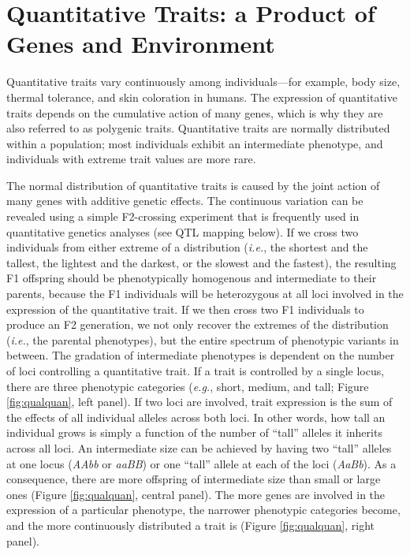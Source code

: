 \documentclass[
]{book}
\begin{document}
\hypertarget{quantitative-traits-a-product-of-genes-and-environment}{%
\section{Quantitative Traits: a Product of Genes and Environment}\label{quantitative-traits-a-product-of-genes-and-environment}}

Quantitative traits vary continuously among individuals---for example, body size, thermal tolerance, and skin coloration in humans. The expression of quantitative traits depends on the cumulative action of many genes, which is why they are also referred to as polygenic traits. Quantitative traits are normally distributed within a population; most individuals exhibit an intermediate phenotype, and individuals with extreme trait values are more rare.

The normal distribution of quantitative traits is caused by the joint action of many genes with additive genetic effects. The continuous variation can be revealed using a simple F2-crossing experiment that is frequently used in quantitative genetics analyses (see QTL mapping below). If we cross two individuals from either extreme of a distribution (\emph{i.e.}, the shortest and the tallest, the lightest and the darkest, or the slowest and the fastest), the resulting F1 offspring should be phenotypically homogenous and intermediate to their parents, because the F1 individuals will be heterozygous at all loci involved in the expression of the quantitative trait. If we then cross two F1 individuals to produce an F2 generation, we not only recover the extremes of the distribution (\emph{i.e.}, the parental phenotypes), but the entire spectrum of phenotypic variants in between. The gradation of intermediate phenotypes is dependent on the number of loci controlling a quantitative trait. If a trait is controlled by a single locus, there are three phenotypic categories (\emph{e.g.}, short, medium, and tall; Figure \ref{fig:qualquan}, left panel). If two loci are involved, trait expression is the sum of the effects of all individual alleles across both loci. In other words, how tall an individual grows is simply a function of the number of ``tall'' alleles it inherits across all loci. An intermediate size can be achieved by having two ``tall'' alleles at one locus (\emph{AAbb} or \emph{aaBB}) or one ``tall'' allele at each of the loci (\emph{AaBb}). As a consequence, there are more offspring of intermediate size than small or large ones (Figure \ref{fig:qualquan}, central panel). The more genes are involved in the expression of a particular phenotype, the narrower phenotypic categories become, and the more continuously distributed a trait is (Figure \ref{fig:qualquan}, right panel).
\end{document}
